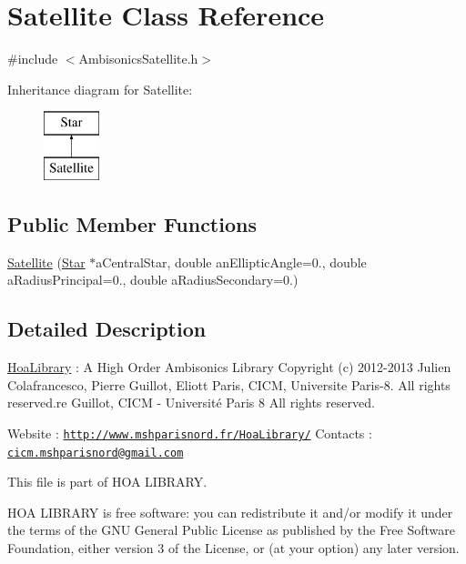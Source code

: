 \hypertarget{class_satellite}{\section{Satellite Class Reference}
\label{class_satellite}
}


{\ttfamily \#include $<$Ambisonics\-Satellite.\-h$>$}

Inheritance diagram for Satellite\-:\begin{figure}[H]
\begin{center}
\leavevmode
\includegraphics[height=2.000000cm]{class_satellite}
\end{center}
\end{figure}
\subsection*{Public Member Functions}
\begin{DoxyCompactItemize}
\item 
\hyperlink{class_satellite_ae33ea904e7f06940431573b906d19bed}{Satellite} (\hyperlink{class_star}{Star} $\ast$a\-Central\-Star, double an\-Elliptic\-Angle=0., double a\-Radius\-Principal=0., double a\-Radius\-Secondary=0.)
\end{DoxyCompactItemize}


\subsection{Detailed Description}
\hyperlink{interface_hoa_library}{Hoa\-Library} \-: A High Order Ambisonics Library Copyright (c) 2012-\/2013 Julien Colafrancesco, Pierre Guillot, Eliott Paris, C\-I\-C\-M, Universite Paris-\/8. All rights reserved.\-re Guillot, C\-I\-C\-M -\/ Université Paris 8 All rights reserved.

Website \-: \href{http://www.mshparisnord.fr/HoaLibrary/}{\tt http\-://www.\-mshparisnord.\-fr/\-Hoa\-Library/} Contacts \-: \href{mailto:cicm.mshparisnord@gmail.com}{\tt cicm.\-mshparisnord@gmail.\-com}

This file is part of H\-O\-A L\-I\-B\-R\-A\-R\-Y.

H\-O\-A L\-I\-B\-R\-A\-R\-Y is free software\-: you can redistribute it and/or modify it under the terms of the G\-N\-U General Public License as published by the Free Software Foundation, either version 3 of the License, or (at your option) any later version.

